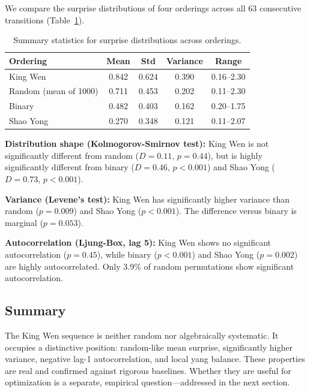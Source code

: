\documentclass{article}
\begin{document}
We compare the surprise distributions of four orderings across all 63 consecutive transitions (Table~\ref{tab:stats}).

\begin{table}[h]
\centering
\begin{tabular}{lcccc}
\toprule
\textbf{Ordering} & \textbf{Mean} & \textbf{Std} & \textbf{Variance} & \textbf{Range} \\
\midrule
King Wen    & 0.842 & 0.624 & 0.390 & 0.16--2.30 \\
Random (mean of 1000) & 0.711 & 0.453 & 0.202 & 0.11--2.30 \\
Binary      & 0.482 & 0.403 & 0.162 & 0.20--1.75 \\
Shao Yong   & 0.270 & 0.348 & 0.121 & 0.11--2.07 \\
\bottomrule
\end{tabular}
\caption{Summary statistics for surprise distributions across orderings.}
\label{tab:stats}
\end{table}

\textbf{Distribution shape (Kolmogorov-Smirnov test):} King Wen is not significantly different from random ($D = 0.11$, $p = 0.44$), but is highly significantly different from binary ($D = 0.46$, $p < 0.001$) and Shao Yong ($D = 0.73$, $p < 0.001$).

\textbf{Variance (Levene's test):} King Wen has significantly higher variance than random ($p = 0.009$) and Shao Yong ($p < 0.001$). The difference versus binary is marginal ($p = 0.053$).

\textbf{Autocorrelation (Ljung-Box, lag 5):} King Wen shows no significant autocorrelation ($p = 0.45$), while binary ($p < 0.001$) and Shao Yong ($p = 0.002$) are highly autocorrelated. Only 3.9\% of random permutations show significant autocorrelation.

\subsection{Summary}

The King Wen sequence is neither random nor algebraically systematic. It occupies a distinctive position: random-like mean surprise, significantly higher variance, negative lag-1 autocorrelation, and local yang balance. These properties are real and confirmed against rigorous baselines. Whether they are useful for optimization is a separate, empirical question---addressed in the next section.

\end{document}
